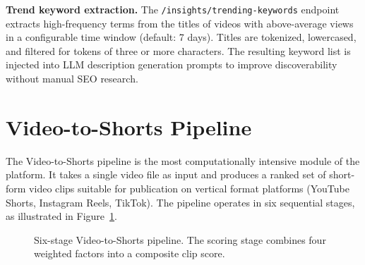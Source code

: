 \documentclass[ENG]{TFUOC}
\begin{document}
\textbf{Trend keyword extraction.} The \texttt{/insights/trending-keywords} endpoint extracts high-frequency terms from the titles of videos with above-average views in a configurable time window (default: 7 days). Titles are tokenized, lowercased, and filtered for tokens of three or more characters. The resulting keyword list is injected into LLM description generation prompts to improve discoverability without manual SEO research.

\section{Video-to-Shorts Pipeline}

The Video-to-Shorts pipeline is the most computationally intensive module of the platform. It takes a single video file as input and produces a ranked set of short-form video clips suitable for publication on vertical format platforms (YouTube Shorts, Instagram Reels, TikTok). The pipeline operates in six sequential stages, as illustrated in Figure~\ref{fig:shorts_pipeline}.

\begin{figure}[H]
\centering
{}
\caption{Six-stage Video-to-Shorts pipeline. The scoring stage combines four weighted factors into a composite clip score.}
\label{fig:shorts_pipeline}
\end{figure}
\end{document}
